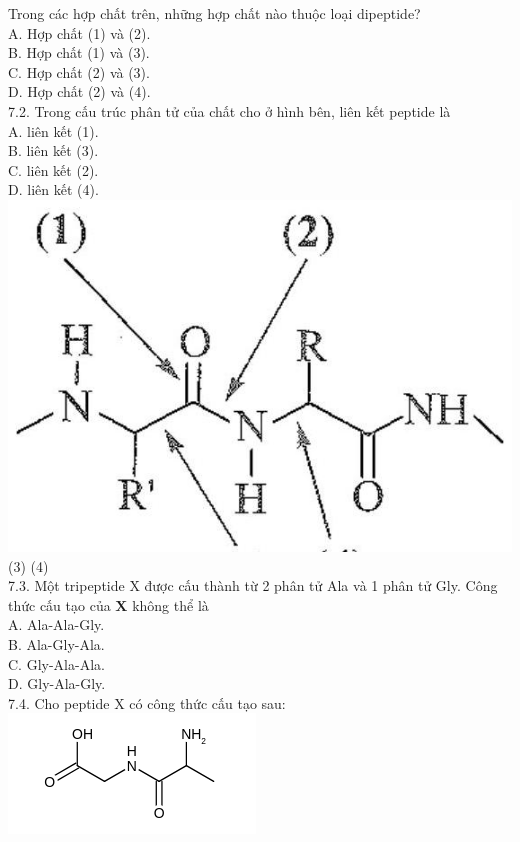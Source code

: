 \documentclass[10pt]{article}
\begin{document}
Trong các hợp chất trên, những hợp chất nào thuộc loại dipeptide?\\
A. Hợp chất (1) và (2).\\
B. Hợp chất (1) và (3).\\
C. Hợp chất (2) và (3).\\
D. Hợp chất (2) và (4).\\
7.2. Trong cấu trúc phân tử của chất cho ở hình bên, liên kết peptide là\\
A. liên kết (1).\\
B. liên kết (3).\\
C. liên kết (2).\\
D. liên kết (4).\\
\includegraphics[max width=\textwidth, center]{2025_10_23_80c1361fcdcd395cad8eg-21}\\
(3) (4)\\
7.3. Một tripeptide X được cấu thành từ 2 phân tử Ala và 1 phân tử Gly. Công thức cấu tạo của $\mathbf{X}$ không thể là\\
A. Ala-Ala-Gly.\\
B. Ala-Gly-Ala.\\
C. Gly-Ala-Ala.\\
D. Gly-Ala-Gly.\\
7.4. Cho peptide X có công thức cấu tạo sau:\\
\includegraphics{smile-ba6876f29ed81fab0d2d80990e0937af4318ddd1}
\end{document}

